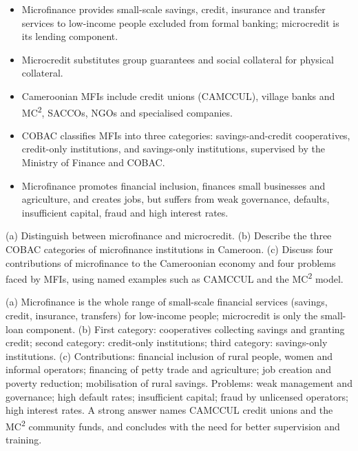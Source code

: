 \documentclass[11pt]{article}
\newcommand{\cle}[1]{{\popxbold\color{popdark}#1}}
\begin{document}
\begin{aretenir}
\begin{itemize}
\item Microfinance provides small-scale savings, credit, insurance and transfer services to low-income people excluded from formal banking; microcredit is its lending component.
\item Microcredit substitutes \cle{group guarantees} and social collateral for physical collateral.
\item Cameroonian MFIs include credit unions (CAMCCUL), village banks and MC\textsuperscript{2}, SACCOs, NGOs and specialised companies.
\item COBAC classifies MFIs into three categories: savings-and-credit cooperatives, credit-only institutions, and savings-only institutions, supervised by the Ministry of Finance and COBAC.
\item Microfinance promotes financial inclusion, finances small businesses and agriculture, and creates jobs, but suffers from weak governance, defaults, insufficient capital, fraud and high interest rates.
\end{itemize}
\end{aretenir}

\begin{exercice}
(a) Distinguish between microfinance and microcredit. (b) Describe the three COBAC categories of microfinance institutions in Cameroon. (c) Discuss four contributions of microfinance to the Cameroonian economy and four problems faced by MFIs, using named examples such as CAMCCUL and the MC\textsuperscript{2} model.
\end{exercice}

\begin{corrige}[Exercise 1]
(a) Microfinance is the whole range of small-scale financial services (savings, credit, insurance, transfers) for low-income people; microcredit is only the small-loan component. (b) First category: cooperatives collecting savings and granting credit; second category: credit-only institutions; third category: savings-only institutions. (c) Contributions: financial inclusion of rural people, women and informal operators; financing of petty trade and agriculture; job creation and poverty reduction; mobilisation of rural savings. Problems: weak management and governance; high default rates; insufficient capital; fraud by unlicensed operators; high interest rates. A strong answer names CAMCCUL credit unions and the MC\textsuperscript{2} community funds, and concludes with the need for better supervision and training.
\end{corrige}
\end{document}
